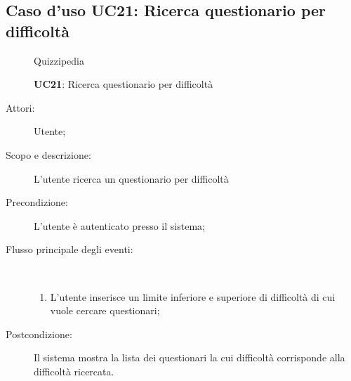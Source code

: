 \subsection{Caso d'uso UC21: Ricerca questionario per difficoltà}
	\begin{figure}[H]
		\centering
		\begin{resizedtikzpicture}{\textwidth}
		\begin{umlsystem}[x=0, fill=lightgray!20]{Quizzipedia}
		\end{umlsystem}
		\end{resizedtikzpicture}
		\caption{\textbf{UC21}: Ricerca questionario per difficoltà}
		\label{UC21}
	\end{figure}
\begin{description}
\item[Attori:] Utente;
\item[Scopo e descrizione:] L'utente ricerca un questionario per difficoltà
      \item[Precondizione:] L'utente è autenticato presso il sistema;

        \item[Flusso principale degli eventi:] \ 
 \begin{enumerate}
          \item L'utente inserisce un limite inferiore e superiore di difficoltà di cui vuole cercare questionari;

      \end{enumerate}
    \item[Postcondizione:] Il sistema mostra la lista dei questionari la cui difficoltà corrisponde alla difficoltà ricercata.
  \end{description}
\hypertarget{UC22}{}
